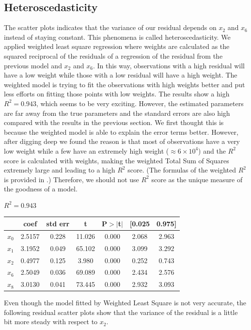 \documentclass{article}
\begin{document}
\subsection{Heteroscedasticity}
The scatter plots indicates that the variance of our residual depends on $x_2$ and $x_6$ instead of staying constant. This phenomena is called heteroscedasticity. We applied weighted least square regression where weights are calculated as the squared reciprocal of the residuals of a regression of the residual from the previous model and $x_2$ and $x_6$. In this way, observations with a high residual will have a low weight while those with a low residual will have a high weight. The weighted model is trying to fit the observations with high weights better and put less efforts on fitting those points with low weights. The results show a high $R^2 = 0.943$, which seems to be very exciting. However, the estimated parameters are far away from the true parameters and the standard errors are also high compared with the results in the previous section. We first thought this is because the weighted model is able to explain the error terms better. However, after digging deep we found the reason is that most of observations have a very low weight while a few have an extremely high weight ($\approx 6 \times 10^4$) and the $R^2$ score is calculated with weights, making the weighted Total Sum of Squares extremely large and leading to a high $R^2$ score. (The formulas of the weighted $R^2$ is provided in .) Therefore, we should not use $R^2$ score as the unique measure of the goodness of a model. 
\begin{center}
$R^2 = 0.943$\\
\begin{tabular}{lcccccc}
\hline
           & \textbf{coef} & \textbf{std err} & \textbf{t} & \textbf{P$> |$t$|$} & \textbf{[0.025} & \textbf{0.975]}  \\
\midrule
\textbf{$x_0$} &       2.5157  &        0.228     &    11.026  &         0.000        &        2.068    &        2.963     \\
\textbf{$x_1$} &       3.1952  &        0.049     &    65.102  &         0.000        &        3.099    &        3.292     \\
\textbf{$x_2$} &       0.4977  &        0.125     &     3.980  &         0.000        &        0.252    &        0.743     \\
\textbf{$x_6$} &       2.5049  &        0.036     &    69.089  &         0.000        &        2.434    &        2.576     \\
\textbf{$x_8$} &       3.0130  &        0.041     &    73.445  &         0.000        &        2.932    &        3.093     \\
\bottomrule
\end{tabular}
\end{center}
Even though the model fitted by Weighted Least Square is not very accurate, the following residual scatter plots show that the variance of the residual is a little bit more steady with respect to $x_2$. 
\end{document}
